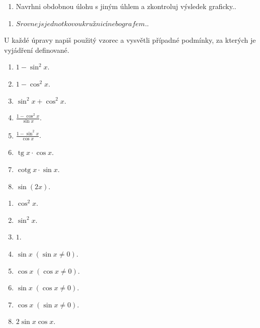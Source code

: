\documentclass[11pt,a4paper]{article}
\begin{document}
\begin{zadaniReseniBox}[title={Rozšíření 1}]
\begin{enumerate}[label=\alph*)]
\item Navrhni obdobnou úlohu s jiným úhlem a zkontroluj výsledek graficky..
\end{enumerate}
\tcblower
\begin{enumerate}[label=\alph*)]
\item $Srovnej s jednotkovou kružnicí nebo grafem.$.
\end{enumerate}
\end{zadaniReseniBox}
U každé úpravy napiš použitý vzorec a vysvětli případné podmínky, za kterých je vyjádření definované.
\begin{zadaniReseniBox}[title={Domácí úkol}]
\begin{enumerate}[label=\alph*)]
\item $1-\sin^2x$.
\item $1-\cos^2x$.
\item $\sin^2x+\cos^2x$.
\item $\frac{1-\cos^2x}{\sin x}$.
\item $\frac{1-\sin^2x}{\cos x}$.
\item $\operatorname{tg}x\cdot\cos x$.
\item $\operatorname{cotg}x\cdot\sin x$.
\item $\sin(2x)$.
\end{enumerate}
\tcblower
\begin{enumerate}[label=\alph*)]
\item $\cos^2x$.
\item $\sin^2x$.
\item $1$.
\item $\sin x\;(\sin x\ne0)$.
\item $\cos x\;(\cos x\ne0)$.
\item $\sin x\;(\cos x\ne0)$.
\item $\cos x\;(\sin x\ne0)$.
\item $2\sin x\cos x$.
\end{enumerate}
\end{zadaniReseniBox}
\end{document}
